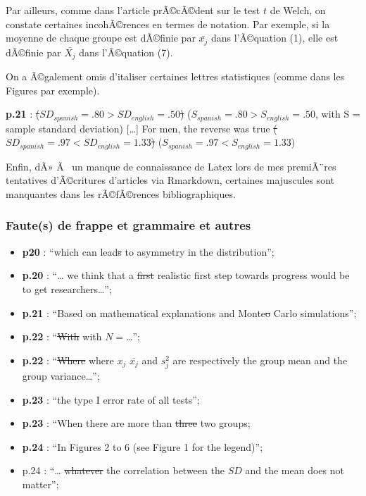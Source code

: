 \begin{appendix}
Par ailleurs, comme dans l'article prÃ©cÃ©dent sur le test \(t\) de
Welch, on constate certaines incohÃ©rences en termes de notation. Par
exemple, si la moyenne de chaque groupe est dÃ©finie par \(\bar{x_j}\)
dans l'Ã©quation (1), elle est dÃ©finie par \(\bar{X_j}\) dans
l'Ã©quation (7).

On a Ã©galement omis d'italiser certaines lettres statistiques (comme
dans les Figures par exemple).

\textbf{p.21} :
\sout{(\(SD_{spanish}=.80 > SD_{english}=.50\)\color{blue})}
(\(S_{spanish}=.80 > S_{english}=.50\)\color{blue}, with S = sample
standard deviation) {[}\ldots{]} \color{black}For men, the reverse was
true \sout{(\(SD_{spanish}=.97 < SD_{english}=1.33\))}
(\(S_{spanish}=.97 < S_{english}=1.33\))

Enfin, dÃ» Ã~ un manque de connaissance de Latex lors de mes premiÃ¨res
tentatives d'Ã©critures d'articles via Rmarkdown, certaines majuscules
sont manquantes dans les rÃ©fÃ©rences bibliographiques.

\hypertarget{fautes-de-frappe-et-grammaire-et-autres}{%
\subsubsection{Faute(s) de frappe et grammaire et
autres}\label{fautes-de-frappe-et-grammaire-et-autres}}

\begin{itemize}
\tightlist
\item
  \textbf{p20} : ``which can lead\sout{s} to asymmetry in the
  distribution'';
\item
  \textbf{p.20} : ``\ldots{} we think that a \sout{first} realistic
  first step towards progress would be to get researchers\ldots{}'';
\item
  \textbf{p.21} : ``Based on mathematical explanations and Monte\sout{o}
  Carlo simulations'';
\item
  \textbf{p.22} : ``\sout{With} \color{blue}w\color{black}ith
  \(N=\)\ldots{}'';
\item
  \textbf{p.22} : ``\sout{Where} \color{blue}w\color{black}here
  \sout{\(x_j\)} \(\bar{x_j}\) and \(s^2_j\) are respectively the group
  mean and the group variance\ldots{}'';
\item
  \textbf{p.23} : ``the type I error rate of all
  test\color{blue}s\color{black}'';
\item
  \textbf{p.23} : ``When there are more than \sout{three}
  \color{blue}two \color{black}groups;
\item
  \textbf{p.24} : ``In Figure\color{blue}s \color{black} 2 to 6 (see
  Figure 1 for the legend)'';
\item
  p.24 : ``\ldots{} \sout{whatever} the correlation between the \(SD\)
  and the mean \color{blue}does not matter\color{black}'';
\end{itemize}


\end{appendix}
